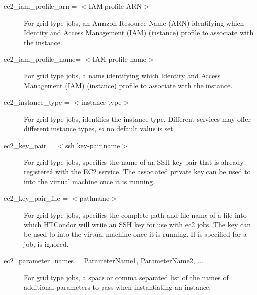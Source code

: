 \begin{description}
\label{condor-submit-ec2-iam-profile-arn}
\item[ec2\_iam\_profile\_arn = $<$IAM profile ARN$>$]
For grid type  jobs,
an Amazon Resource Name (ARN)
identifying which Identity and Access Management (IAM) (instance) profile to
associate with the instance.


\label{condor-submit-ec2-iam-profile-name}
\item[ec2\_iam\_profile\_name= $<$IAM profile name$>$]
For grid type  jobs, a name
identifying which Identity and Access Management (IAM) (instance) profile to
associate with the instance.


\label{condor-submit-ec2-instance-type}
\item[ec2\_instance\_type = $<$instance type$>$]
For grid type  jobs, identifies the instance type.
Different services may offer different instance types,
so no default value is set.


\item[ec2\_key\_pair = $<$ssh key-pair name$>$]
For grid type  jobs, 
specifies the name of an SSH key-pair that is already registered
with the EC2 service.
The associated private key can be used to  into the
virtual machine once it is running.


\item[ec2\_key\_pair\_file = $<$pathname$>$]
For grid type  jobs, 
specifies the complete path and file name of a file into which 
HTCondor will write an SSH key for use with ec2 jobs. 
The key can be used to  into the
virtual machine once it is running.
If  is specified for a job,
 is ignored.


\label{condor-submit-ec2-parameter-names}
\item[ec2\_parameter\_names = ParameterName1, ParameterName2, ...]
For grid type  jobs,
a space or comma separated list of the names of additional parameters
to pass when instantiating an instance.


\end{description}
